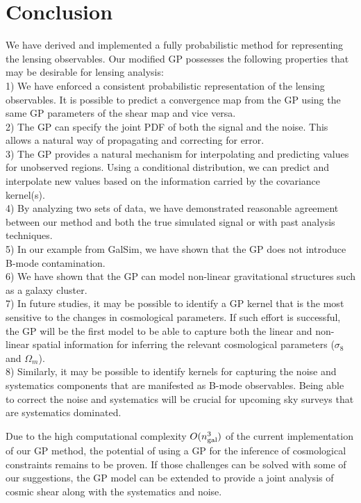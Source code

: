 \section{Conclusion}
We have derived and implemented a fully probabilistic method for 
representing the lensing observables. 
Our modified GP possesses the following properties that may be desirable
for lensing analysis: \\ 
1) We have enforced a consistent probabilistic representation of the lensing 
observables. It is possible to predict a convergence map from the GP using
the same GP parameters of the shear map and vice versa.\\ 
2) The GP can specify the joint PDF of both the signal and the noise. 
This allows a natural way of propagating and correcting for error.\\
3) The GP provides a natural mechanism for interpolating  
and predicting values for unobserved regions. Using a conditional distribution, 
we can predict and interpolate new values based on the  information carried by
the covariance kernel(s).
\\ 
4) By analyzing two sets of data, 
we have demonstrated reasonable agreement between our method and both the true
simulated signal or with past analysis techniques.  \\
5) In our example from {\sc GalSim}, we have shown that the GP does not
introduce B-mode contamination. \\
6) We have shown that the GP can model non-linear gravitational structures such 
as a galaxy cluster. \\ 
7) In future studies, it may be possible to identify a GP kernel that is the most 
sensitive to the changes in cosmological parameters. 
If such effort is successful, the GP will be the first model to be able to
capture both the linear and non-linear spatial information for inferring the relevant
cosmological parameters ($\sigma_8$ and $\Omega_m$).\\
8) Similarly, it may be
possible to identify kernels for capturing the noise and systematics components 
that are manifested as B-mode observables. Being able to correct the noise and
systematics will be crucial for upcoming sky surveys that are systematics
dominated.

Due to the high computational complexity $O(n_{\rm gal}^3)$ of the current
implementation of our GP method,  
the potential of using a GP for the inference of cosmological
constraints remains to be proven.
If those challenges can be solved with some of our
suggestions, the GP model can be 
extended to provide a joint analysis of cosmic shear along with 
the systematics and noise. 






